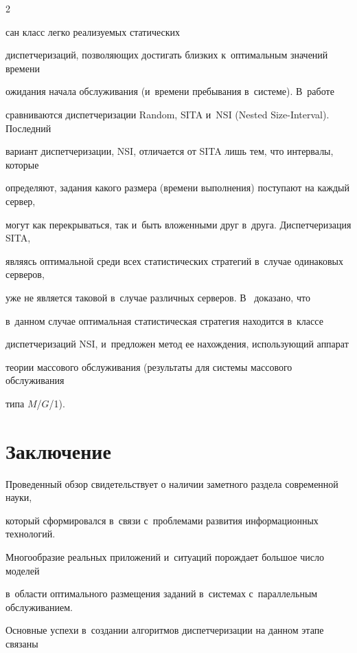 \begin{multicols}{2}
\pagebreak





\noindent


сан класс легко реализуемых статических 


диспетчеризаций, позволяющих достигать близких к~оптимальным значений времени 


ожидания начала обслуживания (и~времени пребывания в~сис\-те\-ме). В~работе 


сравниваются диспетчеризации Random, SITA и~NSI (Nested Size-Interval). Последний 


вариант диспетчеризации, NSI, отличается от SITA лишь тем, что интервалы, которые 


определяют, задания какого размера (времени выполнения) поступают на каждый сервер, 


могут как перекрываться, так и~быть вложенными друг в~друга. Диспетчеризация SITA, 


являясь оптимальной среди всех статистических стратегий в~случае одинаковых серверов, 


уже не является таковой в~случае различных серверов. В~\cite{15-kon} доказано, что 


в~данном случае оптимальная статистическая стратегия находится в~классе 


диспетчеризаций NSI, и~предложен метод ее на\-хож\-дения, использующий аппарат 


теории массового обслуживания (результаты для системы массового обслуживания 


типа $M$/$G$/1).





\section{Заключение}





    Проведенный обзор свидетельствует о наличии заметного раздела современной науки,  


который сформировался в~связи с~проблемами развития информационных технологий. 


Многообразие реальных приложений и~ситуаций порождает большое число моделей 


в~области оптимального размещения заданий в~системах с~параллельным обслуживанием. 


Основные успехи в~создании алгоритмов диспетчеризации на данном этапе связаны 



\end{multicols}
